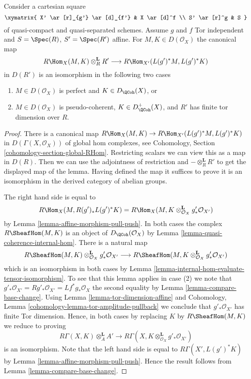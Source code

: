 \begin{lemma}
\label{lemma-affine-morphism-and-hom-out-of-perfect}
Consider a cartesian square
$$
\xymatrix{
X' \ar[r]_{g'} \ar[d]_{f'} & X \ar[d]^f \\
S' \ar[r]^g & S
}
$$
of quasi-compact and quasi-separated schemes. Assume $g$ and $f$
Tor independent and $S = \Spec(R)$, $S' = \Spec(R')$ affine. For
$M, K \in D(\mathcal{O}_X)$ the canonical map
$$
R\Hom_X(M, K) \otimes^\mathbf{L}_R R'
\longrightarrow
R\Hom_{X'}(L(g')^*M, L(g')^*K)
$$
in $D(R')$ is an isomorphism in the following two cases
\begin{enumerate}
\item $M \in D(\mathcal{O}_X)$ is perfect and $K \in D_\QCoh(X)$, or
\item $M \in D(\mathcal{O}_X)$ is pseudo-coherent,
$K \in D_\QCoh^+(X)$, and $R'$ has finite tor dimension over $R$.
\end{enumerate}
\end{lemma}

\begin{proof}
There is a canonical map
$R\Hom_X(M, K) \to R\Hom_{X'}(L(g')^*M, L(g')^*K)$
in $D(\Gamma(X, \mathcal{O}_X))$ of global hom complexes, see
Cohomology, Section \ref{cohomology-section-global-RHom}.
Restricting scalars we can view this as a map in $D(R)$.
Then we can use the adjointness of restriction and
$- \otimes_R^\mathbf{L} R'$ to get the displayed map of the lemma.
Having defined the map it suffices to prove it is an isomorphism
in the derived category of abelian groups.

\medskip\noindent
The right hand side is equal to
$$
R\Hom_X(M, R(g')_*L(g')^*K) =
R\Hom_X(M, K \otimes_{\mathcal{O}_X}^\mathbf{L} g'_*\mathcal{O}_{X'})
$$
by Lemma \ref{lemma-affine-morphism-pull-push}. In both cases the complex
$R\SheafHom(M, K)$ is an object of $D_\QCoh(\mathcal{O}_X)$ by
Lemma \ref{lemma-quasi-coherence-internal-hom}. There is a natural map
$$
R\SheafHom(M, K) \otimes_{\mathcal{O}_X}^\mathbf{L} g'_*\mathcal{O}_{X'}
\longrightarrow
R\SheafHom(M, K \otimes_{\mathcal{O}_X}^\mathbf{L} g'_*\mathcal{O}_{X'})
$$
which is an isomorphism in both cases by
Lemma \ref{lemma-internal-hom-evaluate-tensor-isomorphism}.
To see that this lemma applies in case (2) we note that
$g'_*\mathcal{O}_{X'} = Rg'_*\mathcal{O}_{X'} =
Lf^*g_*\mathcal{O}_X$ the second equality by
Lemma \ref{lemma-compare-base-change}.
Using Lemma \ref{lemma-tor-dimension-affine} and
Cohomology, Lemma \ref{cohomology-lemma-tor-amplitude-pullback}
we conclude that $g'_*\mathcal{O}_{X'}$ has finite Tor dimension.
Hence, in both cases by replacing $K$ by $R\SheafHom(M, K)$ we reduce
to proving
$$
R\Gamma(X, K) \otimes^\mathbf{L}_A A' \longrightarrow
R\Gamma(X, K \otimes^\mathbf{L}_{\mathcal{O}_X} g'_*\mathcal{O}_{X'})
$$
is an isomorphism.
Note that the left hand side is equal to $R\Gamma(X', L(g')^*K)$
by Lemma \ref{lemma-affine-morphism-pull-push}.
Hence the result follows from
Lemma \ref{lemma-compare-base-change}.
\end{proof}

